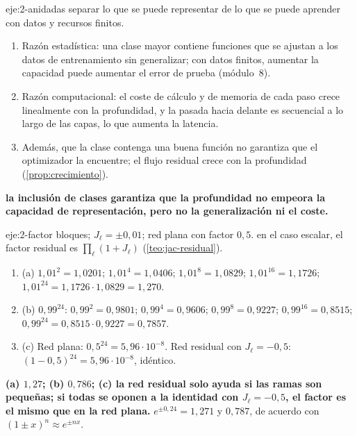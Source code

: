 \begin{solucion}{eje:2-anidadas}
\planteamiento separar lo que se puede representar de lo que se puede aprender con datos y recursos finitos.
\pasos
\begin{enumerate}[label=\arabic*.]
  \item Razón estadística: una clase mayor contiene funciones que se ajustan a los datos de entrenamiento sin generalizar; con datos finitos, aumentar la capacidad puede aumentar el error de prueba (módulo~8).
  \item Razón computacional: el coste de cálculo y de memoria de cada paso crece linealmente con la profundidad, y la pasada hacia delante es secuencial a lo largo de las capas, lo que aumenta la latencia.
  \item Además, que la clase contenga una buena función no garantiza que el optimizador la encuentre; el flujo residual crece con la profundidad (\cref{prop:crecimiento}).
\end{enumerate}
\resultado \textbf{la inclusión de clases garantiza que la profundidad no empeora la capacidad de representación, pero no la generalización ni el coste.}
\end{solucion}

\begin{solucion}{eje:2-factor}
 bloques; $J_\ell=\pm 0{,}01$; red plana con factor $0{,}5$.
\planteamiento en el caso escalar, el factor residual es $\prod_\ell(1+J_\ell)$ (\cref{teo:jac-residual}).
\pasos
\begin{enumerate}[label=\arabic*.]
  \item (a) $1{,}01^{2}=1{,}0201$; $1{,}01^{4}=1{,}0406$; $1{,}01^{8}=1{,}0829$; $1{,}01^{16}=1{,}1726$; $1{,}01^{24}=1{,}1726\cdot 1{,}0829=1{,}270$.
  \item (b) $0{,}99^{24}$: $0{,}99^{2}=0{,}9801$; $0{,}99^{4}=0{,}9606$; $0{,}99^{8}=0{,}9227$; $0{,}99^{16}=0{,}8515$; $0{,}99^{24}=0{,}8515\cdot 0{,}9227=0{,}7857$.
  \item (c) Red plana: $0{,}5^{24}=5{,}96\cdot 10^{-8}$. Red residual con $J_\ell=-0{,}5$: $(1-0{,}5)^{24}=5{,}96\cdot 10^{-8}$, idéntico.
\end{enumerate}
\resultado \textbf{(a) $1{,}27$; (b) $0{,}786$; (c) la red residual solo ayuda si las ramas son pequeñas; si todas se oponen a la identidad con $J_\ell=-0{,}5$, el factor es el mismo que en la red plana.}
\comprobacion $e^{\pm 0{,}24}=1{,}271$ y $0{,}787$, de acuerdo con $(1\pm x)^{n}\approx e^{\pm nx}$.
\end{solucion}

